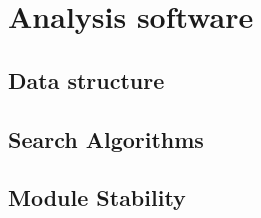 
\chapter{Analysis software}
\label{ch:Analysis software}

  \section{Data structure}
  \label{ch:Analysis software:sec:Data structure}


  \section{Search Algorithms}
  \label{ch:Analysis software:sec:Search algorithms}
  
  \section{Module Stability}
  \label{ch:Analysis software:sec:Module Stability}
